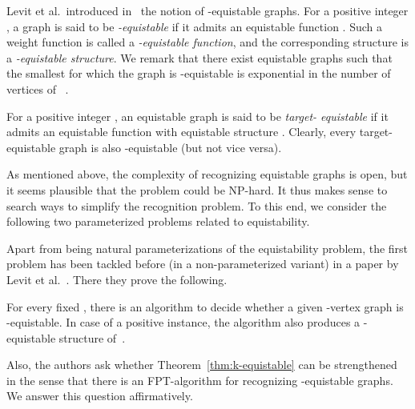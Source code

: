 \documentclass{llncs}
\begin{document}
Levit et al.~introduced in~\cite{MR3040147} the notion of -equistable graphs. For a positive integer , a graph  is said to be {\em -equistable} if it admits an equistable function . Such a weight function is called a {\em -equistable function}, and the corresponding structure  is a {\em -equistable structure}. We remark that there exist equistable graphs such that the smallest  for which the graph is -equistable is exponential in the number of vertices of ~\cite{MR2823204}.

For a positive integer , an equistable graph  is said to be {\em \hbox{target-} equistable} if it admits an equistable
function  with equistable structure .
Clearly, every target- equistable graph is also -equistable (but not vice versa).

\begin{sloppypar}
As mentioned above, the complexity of recognizing equistable graphs is open, but it seems \hbox{plausible} that the problem could be NP-hard. It thus makes sense to search ways to simplify the recognition problem. To this end, we consider the following two parameterized problems related to equistability.
\end{sloppypar}

\medskip
\begin{center}
\fbox{\parbox{0.82\linewidth}{\noindent
{\sc -Equistability}\.8ex]
\begin{tabular*}{.9\textwidth}{rl}
{\em Input:} & A graph , a positive integer .\\
{\em Parameter:} & .\\
{\em Question:} & Is  target- equistable?
\end{tabular*}
}}
\end{center}

Apart from being natural parameterizations of the equistability problem, the
first problem has been tackled before (in a non-parameterized variant)
in a paper by Levit et al.~\cite{MR3040147}. There they prove the following.

\begin{theorem}\label{thm:k-equistable}
For every fixed , there is an  algorithm
to decide whether a given -vertex graph is -equistable.
In case of a positive instance, the algorithm also produces a -equistable structure of~.
\end{theorem}

Also, the authors ask whether Theorem~\ref{thm:k-equistable} can be strengthened in the sense that there is an FPT-algorithm for recognizing -equistable graphs.
We answer this question affirmatively.
\end{document}
